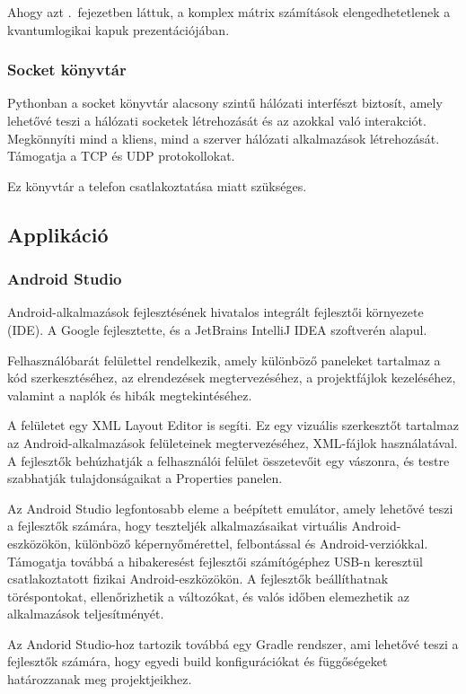 \documentclass[
]{thesis-ekf}
\theoremstyle{definition}
\theoremstyle{remark}
\begin{document}
Ahogy azt \az{\ref{kvantumkapuk}}.~fejezetben láttuk, a komplex mátrix számítások elengedhetetlenek a kvantumlogikai kapuk prezentációjában.

\subsubsection{Socket könyvtár}
Pythonban a socket könyvtár alacsony szintű hálózati interfészt biztosít, amely lehetővé teszi a hálózati socketek létrehozását és az azokkal való interakciót. Megkönnyíti mind a kliens, mind a szerver hálózati alkalmazások létrehozását. Támogatja a TCP és UDP protokollokat. 

Ez könyvtár a telefon csatlakoztatása miatt szükséges.

\subsection{Applikáció}
\subsubsection{Android Studio}
Android-alkalmazások fejlesztésének hivatalos integrált fejlesztői környezete (IDE). A Google fejlesztette, és a JetBrains IntelliJ IDEA szoftverén alapul. 

Felhasználóbarát felülettel rendelkezik, amely különböző paneleket tartalmaz a kód szerkesztéséhez, az elrendezések megtervezéséhez, a projektfájlok kezeléséhez, valamint a naplók és hibák megtekintéséhez.

A felületet egy XML Layout Editor is segíti. Ez egy vizuális szerkesztőt tartalmaz az Android-alkalmazások felületeinek megtervezéséhez, XML-fájlok használatával. A fejlesztők behúzhatják a felhasználói felület összetevőit egy vászonra, és testre szabhatják tulajdonságaikat a Properties panelen.

Az Android Studio legfontosabb eleme a beépített emulátor, amely lehetővé teszi a fejlesztők számára, hogy teszteljék alkalmazásaikat virtuális Android-eszközökön, különböző képernyőmérettel, felbontással és Android-verziókkal. Támogatja továbbá a hibakeresést fejlesztői számítógéphez USB-n keresztül csatlakoztatott fizikai Android-eszközökön. A fejlesztők beállíthatnak töréspontokat, ellenőrizhetik a változókat, és valós időben elemezhetik az alkalmazások teljesítményét.

Az Andorid Studio-hoz tartozik továbbá egy Gradle rendszer, ami lehetővé teszi a fejlesztők számára, hogy egyedi build konfigurációkat és függőségeket határozzanak meg projektjeikhez.
\end{document}
